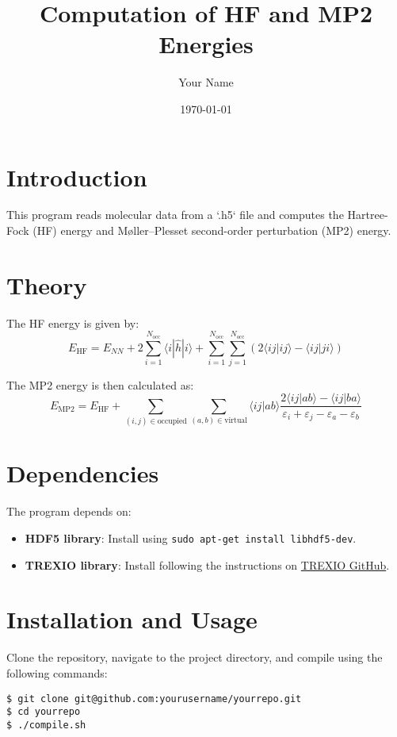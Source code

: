 \documentclass{article}
\begin{document}
\title{Computation of HF and MP2 Energies}
\author{Your Name}
\date{\today}
\maketitle

\section*{Introduction}
This program reads molecular data from a `.h5` file and computes the Hartree-Fock (HF) energy and Møller–Plesset second-order perturbation (MP2) energy.

\section*{Theory}
The HF energy is given by:
\begin{equation}
E_{\text{HF}} = E_{NN} + 2\sum_{i=1}^{N_{\text{occ}}}\langle i|\hat{h}|i\rangle + \sum_{i=1}^{N_{\text{occ}}}\sum_{j=1}^{N_{\text{occ}}} \left(2\langle ij|ij\rangle - \langle ij|ji\rangle\right)
\end{equation}

The MP2 energy is then calculated as:
\begin{equation}
E_{\text{MP2}} = E_{\text{HF}} + 
\sum_{(i,j)\in\text{occupied}}\sum_{(a,b)\in\text{virtual}}\langle ij|ab\rangle\frac{2\langle ij|ab\rangle-\langle ij|ba\rangle}{\varepsilon_i+\varepsilon_j-\varepsilon_a-\varepsilon_b}
\end{equation}

\section*{Dependencies}
The program depends on:
\begin{itemize}
    \item \textbf{HDF5 library}: Install using \texttt{sudo apt-get install libhdf5-dev}.
    \item \textbf{TREXIO library}: Install following the instructions on \href{https://github.com/TREX-CoE/trexio}{TREXIO GitHub}.
\end{itemize}

\section*{Installation and Usage}
Clone the repository, navigate to the project directory, and compile using the following commands:
\begin{verbatim}
$ git clone git@github.com:yourusername/yourrepo.git
$ cd yourrepo
$ ./compile.sh
\end{verbatim}
\end{document}
